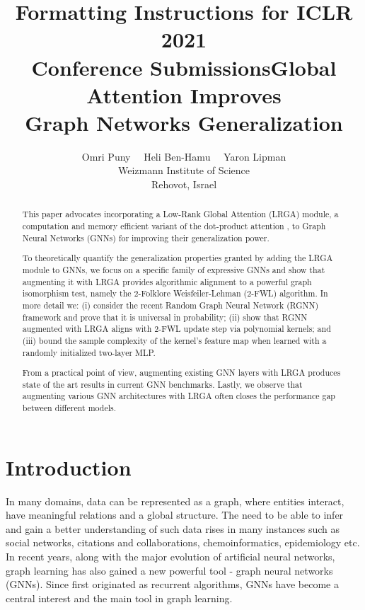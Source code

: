 \documentclass{article} \usepackage{iclr2021_conference,times}
\title{Formatting Instructions for ICLR 2021 \\ Conference Submissions}
\title{Global Attention Improves\\ Graph Networks Generalization
}
\author{Omri Puny \ \   Heli Ben-Hamu \ \  Yaron Lipman \\
Weizmann Institute of Science\\
	Rehovot, Israel \\
}
\begin{document}
\maketitle


\begin{abstract}












  This paper advocates incorporating a Low-Rank Global Attention (LRGA) module, a computation and memory efficient variant of the dot-product attention \citep{vaswani2017attention}, to Graph Neural Networks (GNNs) for improving their generalization power. 
  
  To theoretically quantify the generalization properties granted by adding the LRGA module to GNNs, we focus on a specific family of expressive GNNs and show that augmenting it with LRGA provides algorithmic alignment to a powerful graph isomorphism test, namely the 2-Folklore Weisfeiler-Lehman (2-FWL) algorithm. In more detail we: (i) consider the recent Random Graph Neural Network (RGNN) \citep{sato2020random} framework and prove that it is universal in probability; (ii) show that RGNN augmented with LRGA aligns with 2-FWL update step via polynomial kernels; and (iii) bound the sample complexity of the kernel's feature map when learned with a randomly initialized two-layer MLP.
  
  From a practical point of view, augmenting existing GNN layers with LRGA produces state of the art results in current GNN benchmarks. Lastly, we observe that augmenting various GNN architectures with LRGA often closes the performance gap between different models. 
  


  


  
\end{abstract}

\section{Introduction}

In many domains, data can be represented as a graph, where entities interact, have meaningful relations and a global structure. The need to be able to infer and gain a better understanding of such data rises in many instances such as social networks, citations and collaborations, chemoinformatics, epidemiology etc. In recent years, along with the major evolution of artificial neural networks, graph learning has also gained a new powerful tool - graph neural networks (GNNs). Since first originated \citep{Gori2005, Scarselli2009} as recurrent algorithms, GNNs have become a central interest and the main tool in graph learning. 
\end{document}
